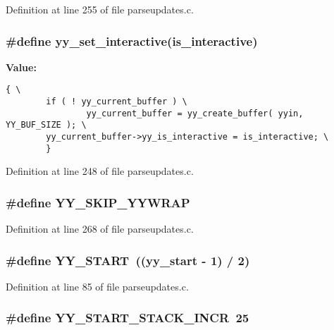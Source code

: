 Definition at line 255 of file parseupdates.c.
\subsubsection{\setlength{\rightskip}{0pt plus 5cm}\#define yy\_\-set\_\-interactive(is\_\-interactive)}\label{parseupdates_8c_a25}


{\bf Value:}

\footnotesize\begin{verbatim}{ \
        if ( ! yy_current_buffer ) \
                yy_current_buffer = yy_create_buffer( yyin, YY_BUF_SIZE ); \
        yy_current_buffer->yy_is_interactive = is_interactive; \
        }
\end{verbatim}\normalsize 


Definition at line 248 of file parseupdates.c.
\subsubsection{\setlength{\rightskip}{0pt plus 5cm}\#define YY\_\-SKIP\_\-YYWRAP}\label{parseupdates_8c_a30}




Definition at line 268 of file parseupdates.c.
\subsubsection{\setlength{\rightskip}{0pt plus 5cm}\#define YY\_\-START\ (({\bf yy\_\-start} - 1) / 2)}\label{parseupdates_8c_a8}




Definition at line 85 of file parseupdates.c.
\subsubsection{\setlength{\rightskip}{0pt plus 5cm}\#define YY\_\-START\_\-STACK\_\-INCR\ 25}\label{parseupdates_8c_a53}




